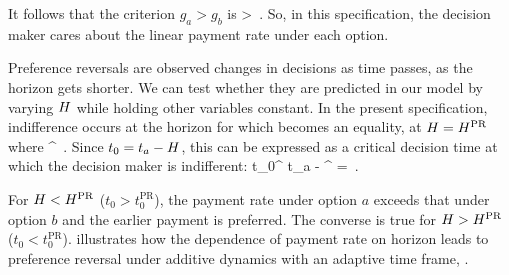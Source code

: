 It follows that the criterion $g_a > g_b$ is
%
\be
{} > \,.
\ee
%
So, in this specification, the decision maker cares about the linear payment rate under each option. 

Preference reversals are observed changes in decisions as time passes, \ie as the horizon gets shorter. We can test whether they are predicted in our model by varying $H$ while holding other variables constant. In the present specification, indifference occurs at the horizon for which  becomes an equality, \ie at $H=H^\text{PR}$ where
%
\be
\hor^ \equiv {}\,.
\ee
%
Since $t_0=t_a-H$, this can be expressed as a critical decision time at which the decision maker is indifferent:
%
\be
t_0^ \equiv t_a - \hor^ = \,.
\ee
%

For $H<H^\text{PR}$ ($t_0>t_0^\text{PR}$), the payment rate under option $a$ exceeds that under option $b$ and the earlier payment is preferred. The converse is true for $H>H^\text{PR}$ ($t_0<t_0^\text{PR}$).  illustrates how the dependence of payment rate on horizon leads to preference reversal under additive dynamics with an adaptive time frame, \cf \citep[Fig.~2]{Kacelnik1997}.

